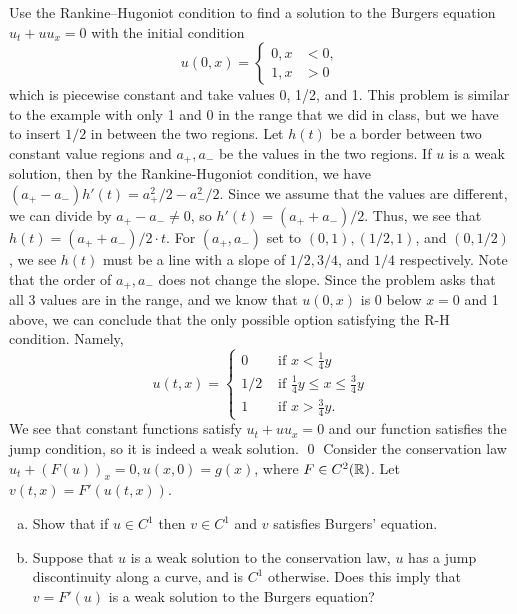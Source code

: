 \documentclass{article}
\begin{document}
\newpage
{} Use the Rankine–Hugoniot condition to find a solution to the Burgers equation
$u_t+ uu_x= 0$ with the initial condition
\[u(0, x) = \begin{cases}
    0, x &< 0,\\
1, x &> 0
\end{cases}\]
which is piecewise constant and take values 0, 1/2, and 1.
\tri
\hop
\solution
This problem is similar to the example with only 1 and 0 in the range that we did in class, but we have to insert $1/2$ in between the two regions.
\hop 
Let $h(t)$ be a border between two constant value regions and $a_+, a_-$ be the values in the two regions. If $u$ is a weak solution, then by the Rankine-Hugoniot condition, we have $(a_+-a_-)h'(t) = a_+^2/2-a_-^2/2$. Since we assume that the values are different, we can divide by $a_+-a_- \ne 0$, so $h'(t) = (a_++a_-)/2$. Thus, we see that $h(t)= (a_++a_-)/2 \cdot t$. For $(a_+,a_-)$ set to $(0,1), (1/2, 1)$, and $(0, 1/2)$, we see $h(t)$ must be a line with a slope of $1/2, 3/4$, and $1/4$ respectively. Note that the order of $a_+,a_-$ does not change the slope. Since the problem asks that all 3 values are in the range, and we know that $u(0,x)$ is 0 below $x=0$ and 1 above, we can conclude that the only possible option satisfying the R-H condition. Namely, 
\[u(t,x)= \begin{cases}
    0 &\text{ if } x <  \frac{1}{4}y \\
    1/2 &\text{ if } \frac{1}{4}y \le x \le  \frac{3}{4}y \\
    1 &\text{ if }x > \frac{3}{4}y.
\end{cases}\]
We see that constant functions satisfy $u_t + uu_x=0$ and our function satisfies the jump condition, so it is indeed a weak solution. \qed
\newpage
{} Consider the conservation law $u_t+ (F (u))_x= 0, u(x, 0) = g(x)$, where $F \in
C^2(\mathbb{R})$. Let $v(t, x) = F'(u(t, x))$.
\begin{enumerate}[(a)]
    \item Show that if $u \in C^1$ then $v \in C^1$ and $v$ satisfies Burgers' equation.
    \item Suppose that $u$ is a weak solution to the conservation law, $u$ has a jump discontinuity
    along a curve, and is $C^1$ otherwise. Does this imply that $v = F '(u)$ is a weak solution to the
    Burgers equation?
\end{enumerate}\tri
\hop
\solution
\end{document}

